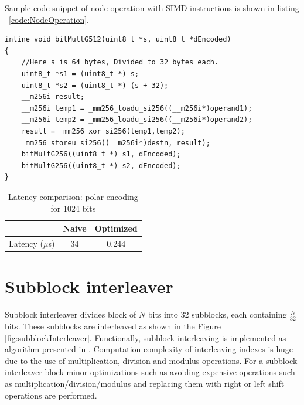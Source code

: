 Sample code snippet of node operation with SIMD instructions is shown in listing ~\ref{code:NodeOperation}.

\begin{code}
	\label{code:NodeOperation}
\begin{verbatim}
inline void bitMultG512(uint8_t *s, uint8_t *dEncoded) 
{
	//Here s is 64 bytes, Divided to 32 bytes each.
	uint8_t *s1 = (uint8_t *) s;
	uint8_t *s2 = (uint8_t *) (s + 32);
	__m256i result;
	__m256i temp1 = _mm256_loadu_si256((__m256i*)operand1);
	__m256i temp2 = _mm256_loadu_si256((__m256i*)operand2);
	result = _mm256_xor_si256(temp1,temp2);
	_mm256_storeu_si256((__m256i*)destn, result);
	bitMultG256((uint8_t *) s1, dEncoded);
	bitMultG256((uint8_t *) s2, dEncoded);
}
\end{verbatim}
\end{code}

\begin{table}[!h]
	\begin{center}
		\caption{Latency comparison: polar encoding for 1024 bits}
		\label{tab:polarEncoder}
		\begin{tabular}{c|c|c} %
			\textbf{ } & Naive & Optimized \\
			\hline
			Latency ($\mu$s) & $34$ & $0.244$\\
		\end{tabular}
	\end{center}
\end{table}


\section{Subblock interleaver}
Subblock interleaver divides block of $N$ bits into $32$ subblocks, each containing $\frac{N}{32}$ bits. These subblocks are interleaved as shown in the Figure \ref{fig:subblockInterleaver}. Functionally, subblock interleaving is implemented as algorithm presented in \cite{3gpp.38.212}. Computation complexity of interleaving indexes is huge due to the use of multiplication, division and modulus operations. For a subblock interleaver block minor optimizations such as avoiding expensive operations such as multiplication/division/modulus and replacing them with right or left shift operations are performed.

